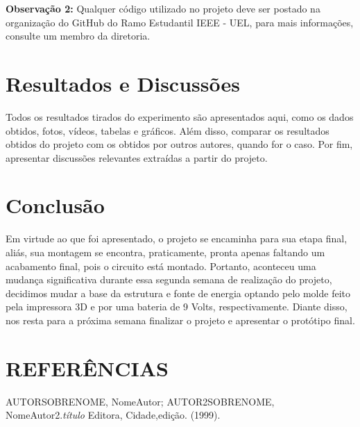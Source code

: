 \documentclass[a4paper,12pt]{article}
\begin{document}
\textbf{Observação 2: }Qualquer código utilizado no projeto deve ser postado na organização do GitHub do Ramo Estudantil IEEE - UEL, para mais informações, consulte um membro da diretoria.

\newpage
\section{Resultados e Discussões}
\label{sec:resultados}
Todos  os  resultados  tirados  do  experimento  são  apresentados  aqui,  como os dados obtidos, fotos, vídeos, tabelas e gráficos. Além disso, comparar os resultados obtidos do projeto com os obtidos por outros autores, quando for o caso. Por fim, apresentar discussões relevantes extraídas a partir do projeto.

\newpage
\section{Conclusão}
\label{sec:conclusao}
Em virtude ao que foi apresentado, o projeto se encaminha para sua etapa final, aliás, sua montagem se encontra, praticamente, pronta apenas faltando um acabamento final, pois o circuito está montado. Portanto, aconteceu uma mudança significativa durante essa segunda semana de realização do projeto,  decidimos  mudar a base da estrutura e fonte de energia optando pelo molde feito pela impressora 3D e por uma bateria de 9 Volts, respectivamente. Diante disso, nos resta para a próxima semana finalizar o projeto e apresentar o protótipo final.

\newpage
\section{REFERÊNCIAS}
\begingroup
\renewcommand{\section}[2]{}

\begin{thebibliography}{3} %

 AUTORSOBRENOME, NomeAutor; AUTOR2SOBRENOME, NomeAutor2.\textit{título} Editora, Cidade,edição. (1999).

\end{thebibliography}
\end{document}
